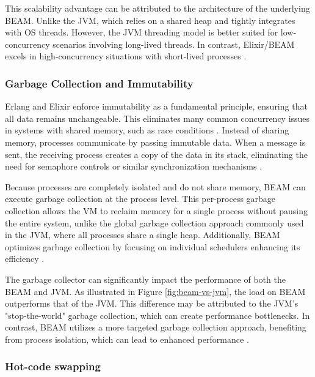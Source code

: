 This scalability advantage can be attributed to the architecture of the underlying \gls{BEAM}. Unlike the \gls{JVM}, which relies on a shared heap and tightly integrates with \gls{OS} threads. However, the \gls{JVM} threading model is better suited for low-concurrency scenarios involving long-lived threads. In contrast, Elixir/\gls{BEAM} excels in high-concurrency situations with short-lived processes \cite{erlang-concurrency-blog, Valkov2018}.

\subsubsection{Garbage Collection and Immutability}

Erlang and Elixir enforce immutability as a fundamental principle, ensuring that all data remains unchangeable. This eliminates many common concurrency issues in systems with shared memory, such as race conditions \cite{Valkov2018}. Instead of sharing memory, processes communicate by passing immutable data. When a message is sent, the receiving process creates a copy of the data in its stack, eliminating the need for semaphore controls or similar synchronization mechanisms \cite{Juric2024,erlang-concurrency-blog}.

Because processes are completely isolated and do not share memory, \gls{BEAM} can execute garbage collection at the process level. This per-process garbage collection allows the \gls{VM} to reclaim memory for a single process without pausing the entire system, unlike the global garbage collection approach commonly used in the \gls{JVM}, where all processes share a single heap. Additionally, \gls{BEAM} optimizes garbage collection by focusing on individual schedulers enhancing its efficiency \cite{Armstrong2013,Juric2024}.

The garbage collector can significantly impact the performance of both the \gls{BEAM} and \gls{JVM}. As illustrated in Figure \ref{fig:beam-vs-jvm}, the load on \gls{BEAM} outperforms that of the \gls{JVM}. This difference may be attributed to the \gls{JVM}'s "stop-the-world" garbage collection, which can create performance bottlenecks. In contrast, \gls{BEAM} utilizes a more targeted garbage collection approach, benefiting from process isolation, which can lead to enhanced performance \cite{Valkov2018, Juric2024}.

\subsubsection{Hot-code swapping}

